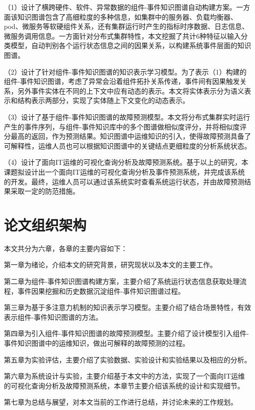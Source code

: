 （1）设计了横跨硬件、软件、异常数据的组件-事件知识图谱自动构建方案。一方面该知识图谱包含了高细粒度的多种信息，如集群中的服务器、负载均衡器、pod、微服务等软硬组件关系，还有集群运行时产生的指标时序数据、日志信息、微服务调用信息。一方面针对分布式集群特性，本文挖掘了共计6种特征以输入分类模型，自动判别各个运行状态信息之间的因果关系，以构建系统事件层面的知识图谱。

（2）设计了针对组件-事件知识图谱的知识表示学习模型。为了表示（1）构建的组件-事件知识图谱，考虑了异常会沿着组件拓扑关系传递，事件间有因果触发关系，另外事件实体在不同的上下文中应有动态的表示。本文将实体表示分为语义表示和结构表示两部分，实现了实体随上下文变化的动态表示。

（3）设计了基于组件-事件知识图谱的故障预测模型。本文将分布式集群实时运行产生的事件序列，与组件-事件知识库中的多个图谱做相似度评分，并将相似度评分最高的返回，作为预测结果。知识图谱中运维知识的引入，使得故障预测具备了可解释性，运维人员也可以根据知识图谱中的关键结点更细粒度的分析系统状态。

（4）设计了面向IT运维的可视化查询分析及故障预测系统。基于以上的研究，本课题拟设计出一个面向IT运维的可视化查询分析及事件预测系统，并完成该系统的开发。最终，运维人员可以通过该系统实时查看系统运行状态，并由故障预测结果采取一定的防范措施。


\section{论文组织架构}
本文共分为六章，各章的主要内容如下：

第一章为绪论，介绍本文的研究背景，研究现状以及本文的主要工作。

第二章为组件-事件知识图谱构建方案，主要介绍了系统运行状态信息获取处理流程，事件因果挖掘和历史数据沉淀组件-事件知识图谱过程。

第三章为基于多注意力机制的知识表示学习模型。主要介绍了结合场景特性，有效表示组件-事件知识图谱的方法。

第四章为引入组件-事件知识图谱的故障预测模型。主要介绍了设计模型引入组件-事件知识图谱中的运维知识，做出可解释的故障预测的过程。

第五章为实验评估，主要介绍了实验数据、实验设计和实验结果以及相应的分析。

第六章为系统设计与实验，主要介绍基于本文中的方法，实现了一个面向IT运维的可视化查询分析及故障预测系统，本章节主要介绍该系统的设计和实现细节。

第七章为总结与展望，对本文当前的工作进行总结，并讨论未来的工作规划。




